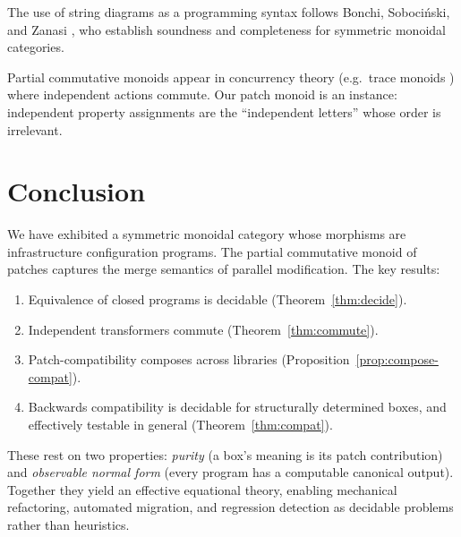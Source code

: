 \documentclass[11pt]{article}
\begin{document}
    The use of string diagrams as a programming syntax follows Bonchi, Soboci\'{n}ski,
    and Zanasi \cite{bonchi2017interacting}, who establish soundness and completeness for
    symmetric monoidal categories.

    Partial commutative monoids appear in concurrency theory (e.g.\ trace monoids
    \cite{diekert1995book}) where independent actions commute. Our patch monoid is an
    instance: independent property assignments are the ``independent letters'' whose
    order is irrelevant.

    \section{Conclusion}

    We have exhibited a symmetric monoidal category whose morphisms are infrastructure
    configuration programs. The partial commutative monoid of patches captures the merge
    semantics of parallel modification. The key results:

    \begin{enumerate}
        \item Equivalence of closed programs is decidable (Theorem~\ref{thm:decide}).
        \item Independent transformers commute (Theorem~\ref{thm:commute}).
        \item Patch-compatibility composes across libraries
            (Proposition~\ref{prop:compose-compat}).
        \item Backwards compatibility is decidable for structurally determined boxes,
            and effectively testable in general (Theorem~\ref{thm:compat}).
    \end{enumerate}

    These rest on two properties: \emph{purity} (a box's meaning is its patch
    contribution) and \emph{observable normal form} (every program has a computable
    canonical output). Together they yield an effective equational theory, enabling
    mechanical refactoring, automated migration, and regression detection as decidable
    problems rather than heuristics.
\end{document}
